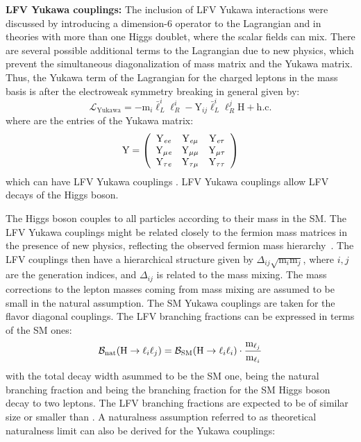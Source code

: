 \textbf{LFV Yukawa couplings:} The inclusion of LFV Yukawa interactions were discussed by introducing a dimension-6 operator to the Lagrangian and in theories with more than one Higgs doublet, where the scalar fields can mix. There are several possible additional terms to the Lagrangian due to new physics, which prevent the simultaneous diagonalization of mass matrix and the Yukawa matrix. Thus, the Yukawa term of the Lagrangian for the charged leptons in the mass basis is after the electroweak symmetry breaking in general given by:
%
\begin{equation}
  \mathcal{L}_{\text{Yukawa}} = -\text{m}_{i} \bar{\ell}_{L}^{i} \ell_{R}^{i} - \text{Y}_{i j} \bar{\ell}_{L}^{i} \ell_{R}^{j} \text{H}+\text{h.c.}
\end{equation}
%
where \Yij are the entries of the Yukawa matrix:
%
\begin{equation}
  \text{Y}=\left(\begin{array}{ccc}
  \text{Y}_{\textit{e}\textit{e}} & \text{Y}_{\textit{e}\mu} & \text{Y}_{\textit{e}\tau} \\
  \text{Y}_{\mu\textit{e}} & \text{Y}_{\mu\mu} & \text{Y}_{\mu\tau} \\
  \text{Y}_{\tau\textit{e}} & \text{Y}_{\tau\mu} & \text{Y}_{\tau\tau}
  \end{array}\right)
\end{equation}
%
which can have LFV Yukawa couplings \Yij. LFV Yukawa couplings allow LFV decays of the Higgs boson.

The Higgs boson couples to all particles according to their mass in the SM. The LFV Yukawa couplings might be related closely to the fermion mass matrices in the presence of new physics, reflecting the observed fermion mass hierarchy~\cite{Cheng:1987rs}. The LFV couplings then have a hierarchical structure given by $\Delta_{ij} \sqrt{\text{m}_{i} \text{m}_{j}}$, where $i, j$ are the generation indices, and $\Delta_{ij}$ is related to the mass mixing. The mass corrections to the lepton masses coming from mass mixing are assumed to be small in the natural assumption. The SM Yukawa couplings are taken for the flavor diagonal couplings. The LFV branching fractions can be expressed in terms of the SM ones:
%
\begin{equation}
  \mathcal{B}_{\text{nat}}(\text{H} \to \ell_{i} \ell_{j}) = \mathcal{B}_{\text{SM}}(\text{H} \to \ell_{i} \ell_{i}) \cdot \frac{\text{m}_{\ell_{j}}}{\text{m}_{\ell_{i}}}
\end{equation}
%
with the total decay width asummed to be the SM one, \BHij being the natural branching fraction and \BHsm being the branching fraction for the SM Higgs boson decay to two leptons. The LFV branching fractions are expected to be of similar size or smaller than \BHij. A naturalness assumption referred to as theoretical naturalness limit can also be derived for the Yukawa couplings:


